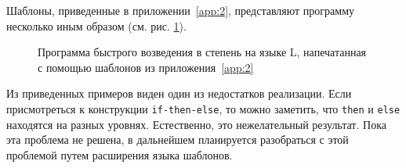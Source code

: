 Шаблоны, приведенные в приложении~\ref{app:2}, представляют программу несколько иным образом (см. рис. \ref{fig:secondTemplatePow}).

\begin{figure}[h!]
	
	\caption{Программа быстрого возведения в степень на языке L, напечатанная с помощью шаблонов из приложения~\ref{app:2}}
	\label{fig:secondTemplatePow}
\end{figure}

Из приведенных примеров виден один из недостатков реализации. Если присмотреться к конструкции \lstinline{if-then-else}, то можно заметить, что \lstinline{then} и \lstinline{else} находятся на разных уровнях. Естественно, это нежелательный результат. Пока эта проблема не решена, в дальнейшем планируется разобраться с этой проблемой путем расширения языка шаблонов.
